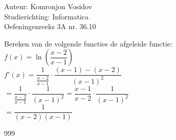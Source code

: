 \documentclass[a4paper]{article}
\begin{document}
	
	\noindent \large Auteur: Komronjon Vosidov \\
	\noindent \large Studierichting: Informatica\\
	\noindent \large Oefeningenreeks 3A nr. 36.10\\
	
	\medskip
	
	\normalsize
	Bereken van de volgende functies de afgeleide functie:\\
	
	$f(x) = \ln \left(\dfrac{x - 2}{x - 1} \right)$\\
	
	$f'(x) = \dfrac{1}{\tfrac{x - 2}{x - 1}} \cdot \dfrac{(x-1) - (x-2)}{(x-1)^2}$\\
	
	$= \dfrac{1}{\tfrac{x - 2}{x - 1}} \cdot \dfrac{1}{(x-1)^2} = \dfrac{x - 1}{x - 2} \cdot \dfrac{1}{(x-1)^2} $\\
	
	$= \dfrac{1}{(x - 2)(x - 1)} $\\
	
	
	
\begin{thebibliography}{999}	
\end{thebibliography}		
\end{document}
